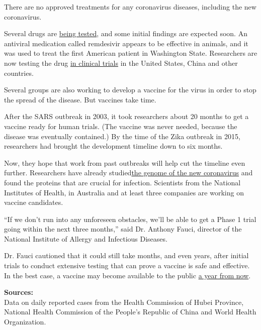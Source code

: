 There are no approved treatments for any coronavirus diseases, including
the new coronavirus.

Several drugs are
\href{https://www.nytimes.com/2020/02/06/health/coronavirus-treatments.html}{being
tested}, and some initial findings are expected soon. An antiviral
medication called remdesivir appears to be effective in animals, and it
was used to treat the first American patient in Washington State.
Researchers are now testing the drug
\href{https://www.nytimes.com/2020/02/26/health/coronavirus-gilead-drug-trials.html}{in
clinical trials} in the United States, China and other countries.

Several groups are also working to develop a vaccine for the virus in
order to stop the spread of the disease. But vaccines take time.

After the SARS outbreak in 2003, it took researchers about 20 months to
get a vaccine ready for human trials. (The vaccine was never needed,
because the disease was eventually contained.) By the time of the Zika
outbreak in 2015, researchers had brought the development timeline down
to six months.

Now, they hope that work from past outbreaks will help cut the timeline
even further. Researchers have already
studied\href{https://ncbiinsights.ncbi.nlm.nih.gov/2020/01/13/novel-coronavirus/}{}\href{https://ncbiinsights.ncbi.nlm.nih.gov/2020/01/13/novel-coronavirus/}{the
genome of the new coronavirus} and found the proteins that are crucial
for infection. Scientists from the National Institutes of Health, in
Australia and at least three companies are working on vaccine
candidates.

``If we don't run into any unforeseen obstacles, we'll be able to get a
Phase 1 trial going within the next three months,'' said Dr. Anthony
Fauci, director of the National Institute of Allergy and Infectious
Diseases.

Dr. Fauci cautioned that it could still take months, and even years,
after initial trials to conduct extensive testing that can prove a
vaccine is safe and effective. In the best case, a vaccine may become
available to the public
\href{https://www.nytimes.com/2020/01/28/health/coronavirus-vaccine.html}{a
year from now}.

\textbf{Sources:}\\
Data on daily reported cases from the Health Commission of Hubei
Province, National Health Commission of the People's Republic of China
and World Health Organization.

